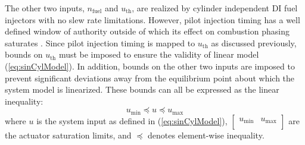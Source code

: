 The other two inputs, $n_{\mathrm{fuel}}$ and $u_{\mathrm{th}}$, are realized by cylinder independent DI fuel injectors with no slew rate limitations. However, pilot injection timing has a well defined window of authority outside of which its effect on combustion phasing saturates \cite{Ravi2012}. Since pilot injection timing is mapped to $u_{\mathrm{th}}$ as discussed previously, bounds on $u_{\mathrm{th}}$ must be imposed to ensure the validity of linear model (\ref{eq:sinCylModel}). In addition, bounds on the other two inputs are imposed to prevent significant deviations away from the equilibrium point about which the system model is linearized. These bounds can all be expressed as the linear inequality:
\begin{equation}
u_{\mathrm{min}} \preceq u \preceq u_{\mathrm{max}}
\end{equation}
where $u$ is the system input as defined in (\ref{eq:sinCylModel}), $\left[\begin{array}{cc}u_{\mathrm{min}} & u_{\mathrm{max}} \\\end{array}\right]$ are the actuator saturation limits, and $\preceq$ denotes element-wise inequality.


